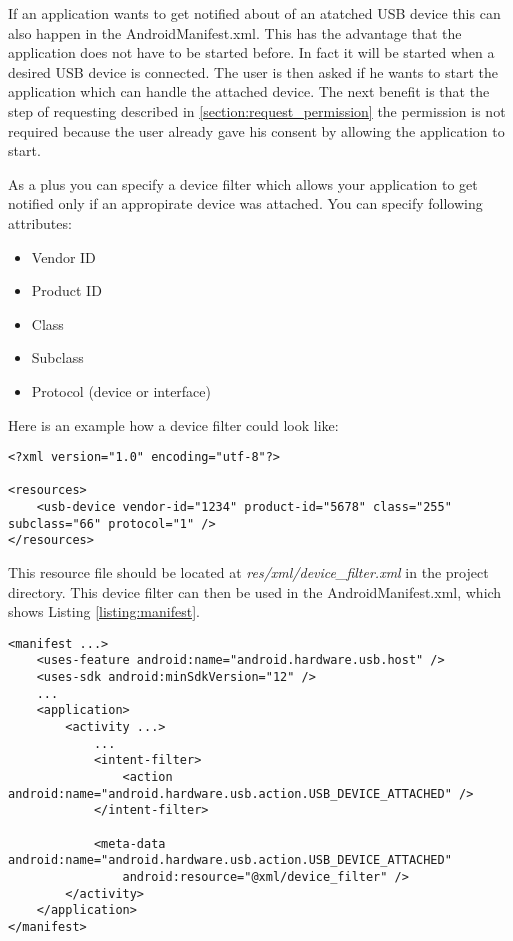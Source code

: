If an application wants to get notified about of an atatched USB device this can also happen in the AndroidManifest.xml. This has the advantage that the application does not have to be started before. In fact it will be started when a desired USB device is connected. The user is then asked if he wants to start the application which can handle the attached device. The next benefit is that the step of requesting described in \ref{section:request_permission} the permission is not required because the user already gave his consent by allowing the application to start.

As a plus you can specify a device filter which allows your application to get notified only if an appropirate device was attached. You can specify following attributes\cite{android_usb_host}:

\begin{itemize}
\item Vendor ID
\item Product ID
\item Class
\item Subclass
\item Protocol (device or interface)
\end{itemize}

Here is an example how a device filter could look like:

\lstset{language=XML}
\begin{lstlisting}[caption=Example device filter\cite{android_usb_host}, label=listing:device_filter]
<?xml version="1.0" encoding="utf-8"?>

<resources>
    <usb-device vendor-id="1234" product-id="5678" class="255" subclass="66" protocol="1" />
</resources>
\end{lstlisting}

This resource file should be located at \textit{res/xml/device\_filter.xml} in the project directory\cite{android_usb_host}. This device filter can then be used in the AndroidManifest.xml, which shows Listing \ref{listing:manifest}.

\begin{lstlisting}[caption=AndroidManifest.xml\cite{android_usb_host}, label=listing:manifest]
<manifest ...>
    <uses-feature android:name="android.hardware.usb.host" />
    <uses-sdk android:minSdkVersion="12" />
    ...
    <application>
        <activity ...>
            ...
            <intent-filter>
                <action android:name="android.hardware.usb.action.USB_DEVICE_ATTACHED" />
            </intent-filter>

            <meta-data android:name="android.hardware.usb.action.USB_DEVICE_ATTACHED"
                android:resource="@xml/device_filter" />
        </activity>
    </application>
</manifest>
\end{lstlisting}

